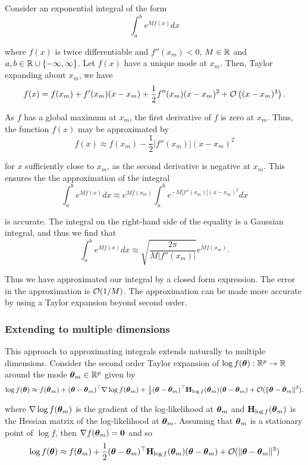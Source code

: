 Consider an exponential integral of the form
$$
	\int_a^b e^{M f(x)} dx
$$

\noindent where $f(x)$ is twice differentiable and $f''(x_m) < 0$, $M \in {\mathbb{R}}$
and $a, b \in {\mathbb{R}} \cup \{-\infty, \infty\}$. Let $f(x)$ have a unique mode at
$x_m$. Then, Taylor expanding about $x_m$, we have
$$
	f(x) = f(x_m) + f'(x_m) (x - x_m) + \frac{1}{2} f''(x_m) (x - x_m)^2 + \mathcal{O}\left((x - x_m)^3\right).
$$

\noindent As $f$ has a global maximum at $x_m$, the first derivative of $f$ is
zero at $x_m$. Thus, the function $f(x)$ may be approximated by
$$
	f(x) \approx f(x_m) - \frac{1}{2} |f''(x_m)| (x - x_m)^2
$$

\noindent for $x$ sufficiently close to $x_m$, as the second derivative is
negative at $x_m$. This ensures the the approximation of the integral
$$
	\int_a^b e^{M f(x)} dx \approx e^{M f(x_m)} \int_a^b e^{-M |f''(x_m)|(x - x_m)^2} dx
$$

\noindent is accurate. The integral on the right-hand side of the equality is a
Gaussian integral, and thus we find that
$$
	\int_a^b e^{M f(x)} dx \approx \sqrt{\frac{2 \pi}{M |f''(x_m)|}} e^{M f(x_m)}.
$$

\noindent Thus we have approximated our integral by a closed form expression.
The error in the approximation is $\mathcal{O}(1/M)$. The approximation can be made
more accurate by using a Taylor expansion beyond second order.

\subsubsection{Extending to multiple dimensions}

This approach to approximating integrals extends naturally to multiple
dimensions. Consider the second order Taylor expansion of $\log f({\boldsymbol \theta}): {\mathbb{R}}^p
\to {\mathbb{R}}$ around the mode ${\boldsymbol \theta}_m \in {\mathbb{R}}^p$ given by
$$
\log f({\boldsymbol \theta}) \approx f({\boldsymbol \theta}_m) + ({\boldsymbol \theta} - {\boldsymbol \theta}_m)^\top \nabla \log f({\boldsymbol \theta}_m) + \tfrac{1}{2} ({\boldsymbol \theta} - {\boldsymbol \theta}_m)^\top {\bf H}_{\log f}({\boldsymbol \theta}_m) ({\boldsymbol \theta} - {\boldsymbol \theta}_m) + \mathcal{O}(\|{\boldsymbol \theta} - {\boldsymbol \theta}_m\|^3).
$$

where $\nabla \log f({\boldsymbol \theta}_m)$ is the gradient of the log-likelihood at
${\boldsymbol \theta}_m$ and ${\bf H}_{\log f}({\boldsymbol \theta}_m)$ is the Hessian matrix of the
log-likelihood at ${\boldsymbol \theta}_m$. Assuming that ${\boldsymbol \theta}_m$ is a stationary point
of $\log f$, then $\nabla f({\boldsymbol \theta}_m) = {\bf 0}$ and so
$$
\log f({\boldsymbol \theta}) \approx f({\boldsymbol \theta}_m) + \frac{1}{2} ({\boldsymbol \theta} - {\boldsymbol \theta}_m)^\top {\bf H}_{\log f}({\boldsymbol \theta}_m) ({\boldsymbol \theta} - {\boldsymbol \theta}_m) + \mathcal{O}(\|{\boldsymbol \theta} - {\boldsymbol \theta}_m\|^3)
$$

